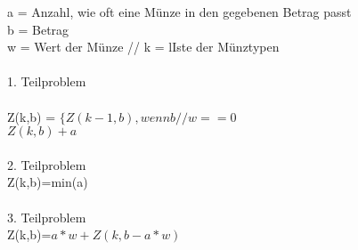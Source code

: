 \documentclass{article}
\begin{document}
a = Anzahl, wie oft eine Münze in den gegebenen Betrag passt
\\b = Betrag
\\ w = Wert der Münze
// k = lIste der Münztypen
\\\\1. Teilproblem
\\\\Z(k,b) = $\Bigg\{ Z(k-1,b), wenn b//w==0$
\\\hspace*{20mm}$Z(k,b)+a$
\\\\2. Teilproblem
\\Z(k,b)=min(a)
\\\\3. Teilproblem
\\Z(k,b)=$a*w+Z(k,b-a*w)$
\end{document}
